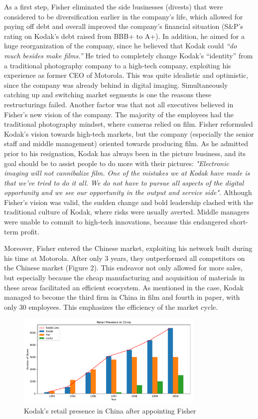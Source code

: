 \documentclass[a4paper,10pt,UTF8]{scrartcl}
\begin{document}
As a first step, Fisher eliminated the side businesses (divests) that were considered 
to be diversification earlier in the company's life, which allowed for paying off debt 
and overall improved the company's financial situation (S\&P's rating on Kodak's debt 
raised from BBB+ to A+). In addition, he aimed for a huge reorganization of the company, 
since he believed that Kodak could \textit{“do much besides make films.”} He tried to completely 
change Kodak's “identity” from a traditional photography company to a high-tech company, 
exploiting his experience as former CEO of Motorola. This was quite idealistic and 
optimistic, since the company was already behind in digital imaging. Simultaneously 
catching up and switching market segments is one the reasons these restructurings 
failed. Another factor was that not all executives believed in Fisher's new vision 
of the company. The majority of the employees had the traditional photography mindset, 
where cameras relied on film. Fisher reformuled Kodak's vision towards high-tech 
markets, but the company (especially the senior staff and middle management) oriented 
towards producing film. As he admitted prior to his resignation, Kodak has always 
been in the picture business, and its goal should be to assist  people to do more 
with their pictures: \textit{"Electronic imaging will not cannibalize film. One of the 
mistakes we at Kodak have made is that we've tried to do it all. We do not have 
to pursue all aspects of the digital opportunity and we see our opportunity in the 
output and service side"}. Although Fisher's vision was valid, the sudden change 
and bold leadership clashed with the traditional culture of Kodak, where risks 
were usually averted. Middle managers were unable to commit to high-tech innovations, 
because this endangered short-term profit.

Moreover, Fisher entered the Chinese market, exploiting his network built 
during his time at Motorola. After only 3 years, they outperformed all competitors 
on the Chinese market (Figure 2). This endeavor not only allowed for more sales, but especially because the cheap manufacturing and acquisition of materials in these areas facilitated an efficient ecosystem. As mentioned in the case, Kodak managed to become the third firm in China in film and fourth in paper, with only 30 employees. This emphasizes the efficiency of the market cycle.

\begin{figure}[htbp]
    \centering
    \includegraphics[width=0.8\textwidth]{retail_presence.pdf}
    \caption{Kodak's retail presence in China after appointing Fisher}
    \label{fig:2}
\end{figure}
\end{document}
